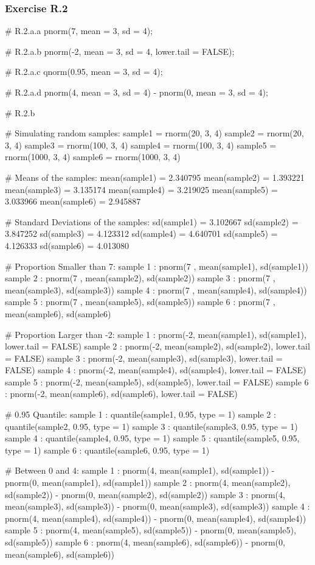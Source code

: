 \documentclass[12pt]{article}
\begin{document}
\subsubsection*{Exercise R.2}
\label{sec:r.2}
\begin{spverbatim}
# R.2.a.a
pnorm(7, mean = 3, sd = 4);

# R.2.a.b
pnorm(-2, mean = 3, sd = 4, lower.tail = FALSE);

# R.2.a.c
qnorm(0.95, mean = 3, sd = 4);

# R.2.a.d
pnorm(4, mean = 3, sd = 4) - pnorm(0, mean = 3, sd = 4);

# R.2.b

# Simulating random samples:
sample1 = rnorm(20, 3, 4)
sample2 = rnorm(20, 3, 4)
sample3 = rnorm(100, 3, 4)
sample4 = rnorm(100, 3, 4)
sample5 = rnorm(1000, 3, 4)
sample6 = rnorm(1000, 3, 4)

# Means of the samples:
mean(sample1) = 2.340795
mean(sample2) = 1.393221
mean(sample3) = 3.135174
mean(sample4) = 3.219025
mean(sample5) = 3.033966
mean(sample6) = 2.945887

# Standard Deviations of the samples:
sd(sample1) = 3.102667
sd(sample2) = 3.847252
sd(sample3) = 4.123312
sd(sample4) = 4.640701
sd(sample5) = 4.126333
sd(sample6) = 4.013080

# Proportion Smaller than 7:
sample 1 : pnorm(7 , mean(sample1), sd(sample1))
sample 2 : pnorm(7 , mean(sample2), sd(sample2))
sample 3 : pnorm(7 , mean(sample3), sd(sample3))
sample 4 : pnorm(7 , mean(sample4), sd(sample4))
sample 5 : pnorm(7 , mean(sample5), sd(sample5))
sample 6 : pnorm(7 , mean(sample6), sd(sample6)

# Proportion Larger than -2:
sample 1 : pnorm(-2, mean(sample1), sd(sample1), lower.tail = FALSE)
sample 2 : pnorm(-2, mean(sample2), sd(sample2), lower.tail = FALSE)
sample 3 : pnorm(-2, mean(sample3), sd(sample3), lower.tail = FALSE)
sample 4 : pnorm(-2, mean(sample4), sd(sample4), lower.tail = FALSE)
sample 5 : pnorm(-2, mean(sample5), sd(sample5), lower.tail = FALSE)
sample 6 : pnorm(-2, mean(sample6), sd(sample6), lower.tail = FALSE)

# 0.95 Quantile: 
sample 1 : quantile(sample1, 0.95, type = 1)
sample 2 : quantile(sample2, 0.95, type = 1)
sample 3 : quantile(sample3, 0.95, type = 1)
sample 4 : quantile(sample4, 0.95, type = 1)
sample 5 : quantile(sample5, 0.95, type = 1)
sample 6 : quantile(sample6, 0.95, type = 1)

# Between 0 and 4:
sample 1 : pnorm(4, mean(sample1), sd(sample1)) - pnorm(0, mean(sample1), sd(sample1))
sample 2 : pnorm(4, mean(sample2), sd(sample2)) - pnorm(0, mean(sample2), sd(sample2))
sample 3 : pnorm(4, mean(sample3), sd(sample3)) - pnorm(0, mean(sample3), sd(sample3))
sample 4 : pnorm(4, mean(sample4), sd(sample4)) - pnorm(0, mean(sample4), sd(sample4))
sample 5 : pnorm(4, mean(sample5), sd(sample5)) - pnorm(0, mean(sample5), sd(sample5))
sample 6 : pnorm(4, mean(sample6), sd(sample6)) - pnorm(0, mean(sample6), sd(sample6))


\end{spverbatim}
\end{document}
